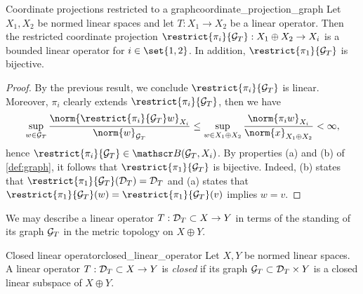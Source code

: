 \begin{proposition}{Coordinate projections restricted to a graph}{coordinate_projection_graph}
    Let \(X_1, X_2\) be normed linear spaces and let \(T : X_1 \to X_2\) be a linear operator. Then the restricted coordinate projection \(\restrict{\pi_i}{\graph{T}} : X_1 \oplus X_2 \to X_i\) is a bounded linear operator for \(i \in \set{1,2}\). In addition, \(\restrict{\pi_1}{\graph{T}}\) is bijective.
\end{proposition}
\begin{proof}
    By the previous result, we conclude \(\restrict{\pi_i}{\graph{T}}\) is linear. Moreover, \(\pi_i\) clearly extends \(\restrict{\pi_i}{\graph{T}}\), then we have
    \begin{equation*}
        \sup_{w \in \graph{T}} \frac{\norm{\restrict{\pi_i}{\graph{T}}w}_{X_i}}{\norm{w}_{\graph{T}}} \leq \sup_{w \in X_1 \oplus X_2} \frac{\norm{\pi_i w}_{X_i}}{\norm{x}_{X_1 \oplus X_2}} < \infty,
    \end{equation*}
    hence \(\restrict{\pi_i}{\graph{T}} \in \bounded(\graph{T}, X_i)\). By properties (a) and (b) of \cref{def:graph}, it follows that \(\restrict{\pi_1}{\graph{T}}\) is bijective. Indeed, (b) states that \(\restrict{\pi_1}{\graph{T}}(\domain{T}) = \domain{T}\) and (a) states that \(\restrict{\pi_1}{\graph{T}}(w) = \restrict{\pi_1}{\graph{T}}(v)\) implies \(w = v\).
\end{proof}

We may describe a linear operator \(T : \mathcal{D}_{T} \subset X \to Y\) in terms of the standing of its graph \(\mathcal{G}_{T}\) in the metric topology on \(X \oplus Y\).
\begin{definition}{Closed linear operator}{closed_linear_operator}
    Let \(X, Y\) be normed linear spaces. A linear operator \(T : \mathcal{D}_{T} \subset X \to Y\) is \emph{closed} if its graph \(\mathcal{G}_{T} \subset \mathcal{D}_{T} \times Y\)  is a closed linear subspace of \(X \oplus Y\).
\end{definition}


